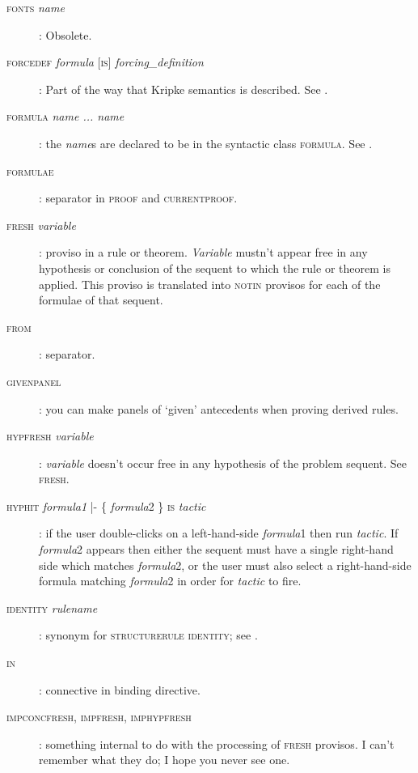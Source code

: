 \begin{description}
\item[\textsc{fonts} \textit{name}]: Obsolete.

\item[\textsc{forcedef} \textit{formula} {[}\textsc{is}{]} \textit{forcing\_definition}]: Part of the way that Kripke semantics is described. See .

\item[\textsc{formula} \textit{name ... name}]: the \textit{name}s are declared to be in the syntactic class \textsc{formula}. See .

\item[\textsc{formulae}]: separator in \textsc{proof} and \textsc{currentproof}.

\item[\textsc{fresh} \textit{variable}]: proviso in a rule or theorem. \textit{Variable} mustn't appear free in any hypothesis or conclusion of the sequent to which the rule or theorem is applied. This proviso is translated into \textsc{notin} provisos for each of the formulae of that sequent.

\item[\textsc{from}]: separator.

\item[\textsc{givenpanel}]: you can make panels of `given' antecedents when proving derived rules.

\item[\textsc{hypfresh} \textit{variable}]: \textit{variable} doesn't occur free in any hypothesis of the problem sequent. See \textsc{fresh.}

\item[\textsc{hyphit} \textit{formula1} |- \{ \textit{formula}2 \} \textsc{is} \textit{tactic}]: if the user double-clicks on a left-hand-side \textit{formula}1 then run \textit{tactic}. If \textit{formula}2 appears then either the sequent must have a single right-hand side which matches \textit{formula}2, or the user must also select a right-hand-side formula matching \textit{formula}2 in order for \textit{tactic} to fire.

\item[\textsc{identity} \textit{rulename}]: synonym for \textsc{structurerule} \textsc{identity}; see .

\item[\textsc{in}]: connective in binding directive.

\item[\textsc{impconcfresh}, \textsc{impfresh}, \textsc{imphypfresh}]: something internal to do with the processing of \textsc{fresh} provisos. I can't remember what they do; I hope you never see one.


\end{description}
